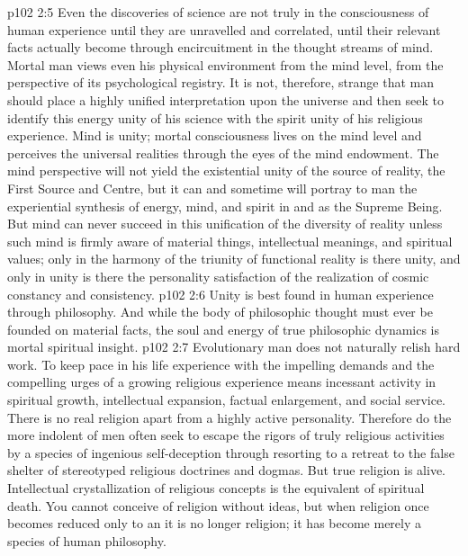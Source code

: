 \vs p102 2:5 Even the discoveries of science are not truly  in the consciousness of human experience until they are unravelled and correlated, until their relevant facts actually become  through encircuitment in the thought streams of mind. Mortal man views even his physical environment from the mind level, from the perspective of its psychological registry. It is not, therefore, strange that man should place a highly unified interpretation upon the universe and then seek to identify this energy unity of his science with the spirit unity of his religious experience. Mind is unity; mortal consciousness lives on the mind level and perceives the universal realities through the eyes of the mind endowment. The mind perspective will not yield the existential unity of the source of reality, the First Source and Centre, but it can and sometime will portray to man the experiential synthesis of energy, mind, and spirit in and as the Supreme Being. But mind can never succeed in this unification of the diversity of reality unless such mind is firmly aware of material things, intellectual meanings, and spiritual values; only in the harmony of the triunity of functional reality is there unity, and only in unity is there the personality satisfaction of the realization of cosmic constancy and consistency.
\vs p102 2:6 Unity is best found in human experience through philosophy. And while the body of philosophic thought must ever be founded on material facts, the soul and energy of true philosophic dynamics is mortal spiritual insight.
\vs p102 2:7 \pc Evolutionary man does not naturally relish hard work. To keep pace in his life experience with the impelling demands and the compelling urges of a growing religious experience means incessant activity in spiritual growth, intellectual expansion, factual enlargement, and social service. There is no real religion apart from a highly active personality. Therefore do the more indolent of men often seek to escape the rigors of truly religious activities by a species of ingenious self\hyp{}deception through resorting to a retreat to the false shelter of stereotyped religious doctrines and dogmas. But true religion is alive. Intellectual crystallization of religious concepts is the equivalent of spiritual death. You cannot conceive of religion without ideas, but when religion once becomes reduced only to an  it is no longer religion; it has become merely a species of human philosophy.
